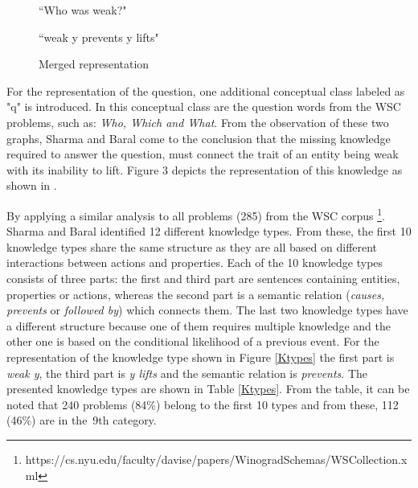 \begin{figure} [h!]
	\centering
	
	\caption{\label{Graph12}``Who was weak?"}
\end{figure}

\begin{figure} [h!]
	\centering
	
	\caption{\label{Graph13} ``weak y prevents y lifts"}
\end{figure}

\begin{figure} [h!]
	\centering
	
	\caption{\label{Graph14} Merged representation}
\end{figure}

For the representation of the question, one additional conceptual class labeled as "q" is introduced. In this conceptual class are the question words from the WSC problems, such as: \textit{Who, Which and What}. 
From the observation of these two graphs, Sharma and Baral \cite{2018CommonsenseKT} come to the conclusion that the missing knowledge required to answer the question, must connect the trait of an entity being weak with its inability to lift. Figure 3 depicts the representation of this knowledge as shown in \cite{2018CommonsenseKT}. 

By applying a similar analysis to all problems (285) from the WSC corpus \footnote{https://cs.nyu.edu/faculty/davise/papers/WinogradSchemas/WSCollection.xml}. Sharma and Baral \cite{2018CommonsenseKT} identified 12 different knowledge types. From these, the first 10 knowledge types share the same structure as they are all based on different interactions between actions and properties. Each of the 10 knowledge types consists of three parts: the first and third part are sentences containing entities, properties or actions, whereas the second part is a semantic relation (\textit{causes, prevents} or \textit{followed by}) which connects them. The last two knowledge types have a different structure because one of them requires multiple knowledge and the other one is based on the conditional likelihood of a previous event. 
For the representation of the knowledge type shown in Figure \ref{Ktypes} the first part is \textit{weak y}, the third part is \textit{y lifts} and the semantic relation is \textit{prevents}. The presented knowledge types are shown in Table \ref{Ktypes}. From the table, it can be noted that 240 problems (84\%) belong to the first 10 types and from these, 112 (46\%) are in the~9th category. \\ 

